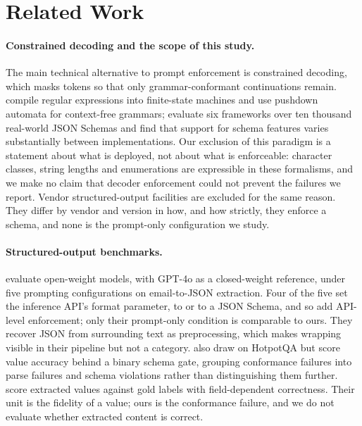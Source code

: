 \section{Related Work}
\label{sec:related}

\paragraph{Constrained decoding and the scope of this study.}
The main technical alternative to prompt enforcement is constrained
decoding, which masks tokens so that only grammar-conformant
continuations remain. \citet{willard2023outlines} compile regular
expressions into finite-state machines and \citet{dong2024xgrammar} use
pushdown automata for context-free grammars; \citet{geng2025jsonschemabench}
evaluate six frameworks over ten thousand real-world JSON Schemas and find
that support for schema features varies substantially between
implementations. Our exclusion of this paradigm is a statement about what
is deployed, not about what is enforceable: character classes, string
lengths and enumerations are expressible in these formalisms, and we make
no claim that decoder enforcement could not prevent the failures we
report. Vendor structured-output facilities are excluded for the same
reason. They differ by vendor and version in how, and how strictly, they
enforce a schema, and none is the prompt-only configuration we study.

\paragraph{Structured-output benchmarks.}
\citet{tenckhoff2026llmstructbench} evaluate open-weight models, with
GPT-4o as a closed-weight reference, under five prompting configurations
on email-to-JSON extraction. Four of the five set the inference API's
format parameter, to  or to a JSON Schema, and so add
API-level enforcement; only their prompt-only condition is comparable
to ours. They recover JSON from surrounding text as preprocessing, which
makes wrapping visible in their pipeline but not a category.
\citet{singh2026sob} also draw on HotpotQA but score value accuracy
behind a binary schema gate, grouping conformance failures into parse
failures and schema violations rather than distinguishing them further.
\citet{ferguson2026extractbench} score extracted values against gold
labels with field-dependent correctness. Their unit is the fidelity of a
value; ours is the conformance failure, and we do not evaluate whether
extracted content is correct.

